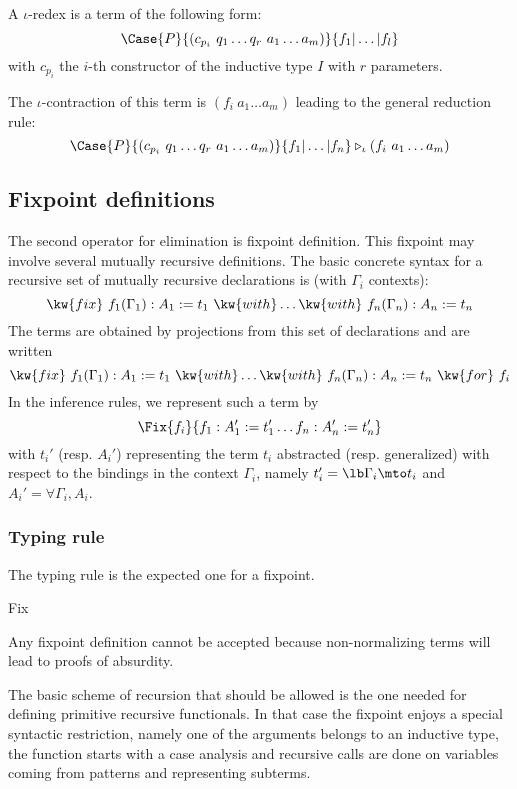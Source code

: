 A $\iota$-redex is a term of the following form:
\[\Case{P}{(c_{p_i}~q_1\ldots  q_r~a_1\ldots  a_m)}{f_1|\ldots |
    f_l}\]
with $c_{p_i}$ the $i$-th constructor of the inductive type $I$ with $r$
parameters.

The $\iota$-contraction of this term is $(f_i~a_1\ldots a_m)$ leading
to the general reduction rule:
\[ \Case{P}{(c_{p_i}~q_1\ldots  q_r~a_1\ldots  a_m)}{f_1|\ldots |
    f_n} \triangleright_{\iota} (f_i~a_1\ldots a_m) \]

\subsection[Fixpoint definitions]{Fixpoint definitions\label{Fix-term} }
The second operator for elimination is fixpoint definition. 
This fixpoint may involve several mutually recursive definitions.
The basic concrete syntax for a recursive set of mutually recursive 
declarations is (with $\Gamma_i$ contexts): 
\[\kw{fix}~f_1 (\Gamma_1) :A_1:=t_1~\kw{with} \ldots \kw{with}~ f_n
(\Gamma_n) :A_n:=t_n\]
The terms are obtained by projections from this set of declarations
and are written 
\[\kw{fix}~f_1 (\Gamma_1) :A_1:=t_1~\kw{with} \ldots \kw{with}~ f_n
(\Gamma_n) :A_n:=t_n~\kw{for}~f_i\]
In the inference rules, we represent such a
term by 
\[\Fix{f_i}{f_1:A_1':=t_1' \ldots f_n:A_n':=t_n'}\]
with $t_i'$ (resp. $A_i'$) representing the term $t_i$ abstracted
(resp. generalized) with
respect to the bindings in the context $\Gamma_i$, namely
$t_i'=\lb \Gamma_i \mto t_i$ and $A_i'=\forall \Gamma_i, A_i$.

\subsubsection{Typing rule}
The typing rule is the expected one for a fixpoint.

\begin{description}
\item[Fix] 
\end{description}

Any fixpoint definition cannot be accepted because non-normalizing terms
will lead to proofs of absurdity.

The basic scheme of recursion that should be allowed is the one needed for 
defining primitive
recursive functionals. In that case the fixpoint enjoys a special
syntactic restriction, namely one of the arguments belongs to an
inductive type, the function starts with a case analysis and recursive
calls are done on variables coming from patterns and representing subterms.

